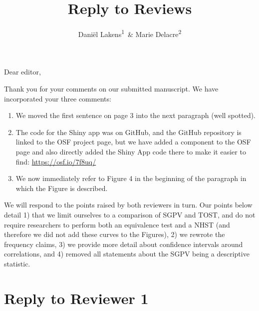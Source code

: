 \documentclass[man]{apa6}
\title{Reply to Reviews}
\author{Daniël Lakens\textsuperscript{1}~\& Marie Delacre\textsuperscript{2}}
\date{}
\affiliation{
\vspace{0.5cm}
\textsuperscript{1} Eindhoven University of Technology, Eindhoven, The Netherlands\\\textsuperscript{2} Service of Analysis of the Data, Université Libre de Bruxelles, Belgium}
\providecommand{\tightlist}{%
  \setlength{\itemsep}{0pt}\setlength{\parskip}{0pt}}
\begin{document}
\maketitle

Dear editor,

Thank you for your comments on our submitted manuscript. We have
incorporated your three comments:

\begin{enumerate}
\def\labelenumi{\arabic{enumi}.}
\tightlist
\item
  We moved the first sentence on page 3 into the next paragraph (well
  spotted).
\item
  The code for the Shiny app was on GitHub, and the GitHub repository is
  linked to the OSF project page, but we have added a component to the
  OSF page and also directly added the Shiny App code there to make it
  easier to find: \url{https://osf.io/7f8uq/}
\item
  We now immediately refer to Figure 4 in the beginning of the paragraph
  in which the Figure is described.
\end{enumerate}

We will respond to the points raised by both reviewers in turn. Our
points below detail 1) that we limit ourselves to a comparison of SGPV
and TOST, and do not require researchers to perform both an equivalence
test and a NHST (and therefore we did not add these curves to the
Figures), 2) we rewrote the frequency claims, 3) we provide more detail
about confidence intervals around correlations, and 4) removed all
statements about the SGPV being a descriptive statistic.

\section{Reply to Reviewer 1}\label{reply-to-reviewer-1}
\end{document}
